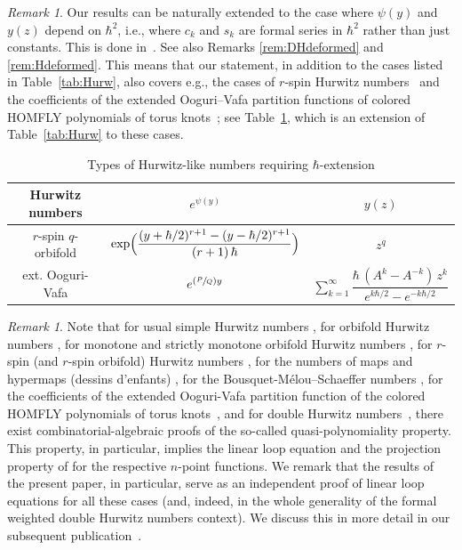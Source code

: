 \documentclass[11pt]{article}
\newcommand{\ie}{i.e.,\xspace}
\newcommand{\eg}{e.g.,\xspace}
\newcommand{\Psfrac}[2]{(\sfrac{#1}{#2})}
\theoremstyle{plain}
\theoremstyle{definition}
\theoremstyle{remark}
\newtheorem{remark}[theorem]{Remark}
\begin{document}
\begin{remark}
Our results can be naturally extended to the case where $\psi(y)$ and $y(z)$ depend on $\hbar^2$, \ie where $c_k$ and $s_k$ are formal series in $\hbar^2$ rather than just constants. This is done in~\cite{BDKS21toprec}. See also Remarks \ref{rem:DHdeformed} and \ref{rem:Hdeformed}. This means that our statement, in addition to the cases listed in Table~\ref{tab:Hurw}, also covers \eg the cases of $r$-spin
Hurwitz numbers~\cite{KLPS19} and the coefficients of the extended Ooguri--Vafa partition functions of colored HOMFLY polynomials of torus knots~\cite{DPSS,DKPSS}; see Table~\ref{tab:Hurwext}, which is an extension of Table~\ref{tab:Hurw} to these cases.
\begin{table}[htb]
\caption{Types of Hurwitz-like numbers requiring $\hbar$-extension}
\label{tab:Hurwext}
\renewcommand{\arraystretch}{2.5}
\begin{tabular}{|c|c|c|}
\hline
Hurwitz numbers & $e^{\psi(y)}$ & $y(z)$\\
\hline
\hline
$r$-spin $q$-orbifold & $\exp\Bigl(\dfrac{(y+\hbar/2)^{r+1}-(y-\hbar/2)^{r+1}}{(r+1)\,\hbar}\Bigr)$ & $z^q$\\
\hline
ext. Ooguri-Vafa
& $e^{\Psfrac{P}{Q}y}$ & $\sum_{k=1}^\infty \dfrac{\hbar\,(A^k-A^{-k})\, z^k}{
e^{k\hbar/2}-e^{-k\hbar/2}
}$\\
\hline
\end{tabular}
\end{table}
\end{remark}

\begin{remark}\label{rem:combalg}
Note that for usual simple Hurwitz numbers \cite{DKOSS,KLS}, for orbifold Hurwitz numbers \cite{DLPS,KLS}, for monotone and strictly monotone orbifold Hurwitz numbers \cite{KLS}, for $r$-spin (and $r$-spin orbifold) Hurwitz numbers \cite{KLPS19}, for the numbers of maps and hypermaps (dessins d'enfants) \cite{KZ2015}, for the Bousquet-Mélou--Schaeffer numbers \cite{BDS}, for the coefficients of the extended Ooguri-Vafa partition function of the colored HOMFLY polynomials of torus knots~\cite{DPSS}, and for double Hurwitz numbers~\cite{BDKLM}, there \hbox{exist} combinatorial-algebraic proofs of the so-called quasi-polynomiality property. This property, in particular, implies the linear loop equation and the projection property of \cite{BS17} for the respective $n$-point functions. We remark that the results of the present paper, in particular, serve as an independent proof of linear loop equations for all these cases (and, indeed, in the whole generality of the formal weighted double Hurwitz numbers context). We discuss this in more detail in our subsequent publication~\cite{BDKS21toprec}.
\end{remark}
\end{document}
